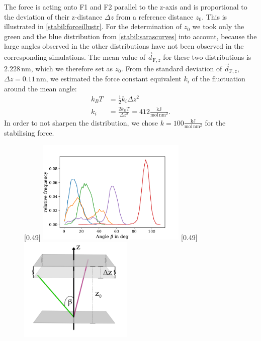The force is acting onto F1 and F2 parallel to the z-axis and is proportional to the deviation of their z-distance $\Delta z$ from a reference distance $z_0$. This is illustrated in \autoref{stabil:forceillustr}. For the determination of $z_0$ we took only the green and the blue distribution from \autoref{stabil:sarascurves} into account, because the large angles observed in the other distributions have not been observed in the corresponding \charmm{} simulations. The mean value of $\vec{d}_{\text{F}, z}$ for these two distributions is $2.228\,\si{\nano\metre}$, which we therefore set as $z_0$. From the standard deviation of $\vec{d}_{\text{F}, z}$, $\Delta z = 0.11\,\si{\nano\metre}$, we estimated the force constant equivalent $k_i$ of the fluctuation around the mean angle:
\begin{align}
k_B T &= \frac{1}{2} k_i \Delta z^2\\
k_i &= \frac{2 k_B T}{\Delta z^2} = 412 \frac{\si{\kilo\joule}}{\si{\mole}\,\si{\nano\metre}^2}.
\end{align}
In order to not sharpen the distribution, we chose $k = 100 \frac{\si{\kilo\joule}}{\si{\mole}\,\si{\nano\metre}^2}$ for the stabilising force.
%
%
%
\begin{figure}[htb]
	\subcaptionbox{\label{stabil:sarascurves}}[0.49\textwidth]{
		\includegraphics[height=5cm]{figures/introduction/sara_angles}
	}\hfill%
	\subcaptionbox{\label{stabil:forceillustr}}[0.49\textwidth]{
		\includegraphics[height=5cm]{figures/introduction/forceapproach}
	}%
\end{figure}
%
%
%
